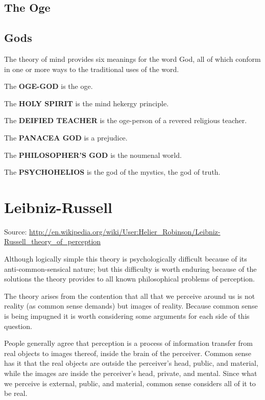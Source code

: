 \documentclass[11pt]{article}
\begin{document}
{{\subsection{The Oge}
\label{sec-1.2}

\subsection{Gods}
\label{sec-1.3}

The theory of mind provides six meanings for the word God,
all of which conform in one or more ways to the traditional
uses of the word.

The \textbf{OGE-GOD} is the oge.

The \textbf{HOLY SPIRIT} is the mind hekergy principle.

The \textbf{DEIFIED TEACHER} is the oge-person of a revered religious teacher.

The \textbf{PANACEA GOD} is a prejudice.

The \textbf{PHILOSOPHER'S GOD} is the noumenal world.

The \textbf{PSYCHOHELIOS} is the god of the mystics, the god of truth.

\section{Leibniz-Russell}
\label{sec-2}

Source: \href{http://en.wikipedia.org/wiki/User:Helier_Robinson/Leibniz-Russell_theory_of_perception}{http://en.wikipedia.org/wiki/User:Helier\_Robinson/Leibniz-Russell\_theory\_of\_perception}

Although logically simple this theory is psychologically difficult because of its anti-common-sensical nature; but this difficulty is worth enduring because of the solutions the theory provides to all known philosophical problems of perception.

The theory arises from the contention that all that we perceive around us is not reality (as common sense demands) but images of reality. Because common sense is being impugned it is worth considering some arguments for each side of this question.

People generally agree that perception is a process of information transfer from real objects to images thereof, inside the brain of the perceiver. Common sense has it that the real objects are outside the perceiver's head, public, and material, while the images are inside the perceiver's head, private, and mental. Since what we perceive is external, public, and material, common sense considers all of it to be real.

}}
\end{document}
